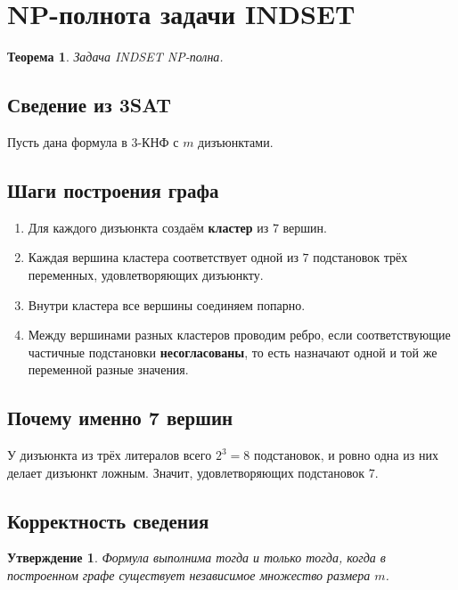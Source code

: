 \documentclass[12pt,a4paper]{article}
\theoremstyle{definition}
\theoremstyle{plain}
\newtheorem{theorem}{Теорема}[section]
\newtheorem{proposition}{Утверждение}[section]
\begin{document}
\section{NP-полнота задачи \texorpdfstring{\textsc{INDSET}}{INDSET}}

\begin{theorem}
Задача \textsc{INDSET} NP-полна.
\end{theorem}

\subsection{Сведение из \textsc{3SAT}}
Пусть дана формула в 3-КНФ с $m$ дизъюнктами.

\subsection{Шаги построения графа}
\begin{enumerate}
\item Для каждого дизъюнкта создаём \textbf{кластер} из $7$ вершин.
\item Каждая вершина кластера соответствует одной из $7$ подстановок трёх переменных, удовлетворяющих дизъюнкту.
\item Внутри кластера все вершины соединяем попарно.
\item Между вершинами разных кластеров проводим ребро, если соответствующие частичные подстановки \textbf{несогласованы}, то есть назначают одной и той же переменной разные значения.
\end{enumerate}

\subsection{Почему именно 7 вершин}
У дизъюнкта из трёх литералов всего $2^3=8$ подстановок, и ровно одна из них делает дизъюнкт ложным. Значит, удовлетворяющих подстановок $7$.

\subsection{Корректность сведения}
\begin{proposition}
Формула выполнима тогда и только тогда, когда в построенном графе существует независимое множество размера $m$.
\end{proposition}
\end{document}
